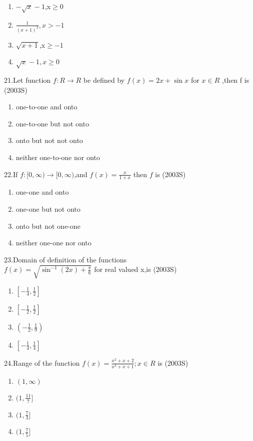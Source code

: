 \documentclass[journal,12pt,twocolumn]{IEEEtran}
\theoremstyle{remark}
\begin{document}
\begin{enumerate}
    \item $-\sqrt{x}-1$,x$\geq$0
    \item $\frac{1}{(x+1)^2},x>-1$
    \item $\sqrt{x+1}$,x$\geq -1$
    \item $\sqrt{x} -1,x\geq 0$
\end{enumerate}
21.Let function $f:R\rightarrow R$ be defined by $f(x)=2x + \sin x$ for $x \in R$ ,then f is
\hfill(2003S)\\
\begin{enumerate}
    \item one-to-one and onto
    \item one-to-one but not onto
    \item onto but not not onto
    \item neither one-to-one nor onto
\end{enumerate}
22.If $f:[0,\infty) \rightarrow [0,\infty)$,and $f(x)=\frac{x}{1+x}$ then $f$ is
\hfill(2003S)\\
\begin{enumerate}
    \item one-one and onto
    \item one-one but not onto
    \item onto but not one-one
    \item neither one-one nor onto
\end{enumerate}
23.Domain of definition of the functions\\ $f(x)=\sqrt{\sin^{-1}(2x)+\frac{\pi}{6}}$ for real valued x,is
\hfill(2003S)\\
\begin{enumerate}
    \item$\left[-\frac{1}{4},\frac{1}{2}\right]$\\
    \item$\left[-\frac{1}{2},\frac{1}{2}\right]$\\
    \item$\left(-\frac{1}{2},\frac{1}{9}\right)$\\
    \item$\left[-\frac{1}{4},\frac{1}{4}\right]$
\end{enumerate}
24.Range of the function $f(x)=\frac{x^2+x+2}{x^2+x+1};x \in R$ is
\hfill(2003S)\\
\begin{enumerate}
    \item $(1,\infty)$
    \item $(1,\frac{11}{7}]$
    \item $(1,\frac{7}{3}]$
    \item $(1,\frac{7}{5}]$
\end{enumerate}
\end{document}

